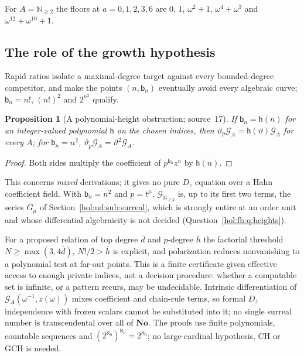 \documentclass[11pt]{article}
\numberwithin{equation}{section}
\newtheorem{proposition}[theorem]{Proposition}
\theoremstyle{definition}
\theoremstyle{remark}
\newcommand{\N}{\mathbb N}
\newcommand{\No}{\mathbf{No}}
\begin{document}
For $A=\N_{\ge2}$ the floors at $a=0,1,2,3,6$ are $0$, $1$, $\omega^2+1$,
$\omega^4+\omega^3$ and $\omega^{12}+\omega^{10}+1$.

\subsection{The role of the growth hypothesis}\label{hol:fh:sub:limits}

Rapid ratios isolate a maximal-degree target against every bounded-degree
competitor, and make the points $(n,\mathsf b_n)$ eventually avoid every
algebraic curve; $\mathsf b_n=n!$, $(n!)^2$ and $2^{n^2}$ qualify.

\begin{proposition}[A polynomial-height obstruction; source~17]
\label{hol:fh:prop:heat}
If $\mathsf b_n=\mathsf h(n)$ for an integer-valued polynomial $\mathsf h$ on
the chosen indices, then $\vartheta_p\mathcal G_A=\mathsf h(\vartheta)\mathcal
G_A$ for every $A$; for $\mathsf b_n=n^2$, $\vartheta_p\mathcal G_A=
\vartheta^2\mathcal G_A$.
\end{proposition}

\begin{proof}
Both sides multiply the coefficient of $p^{\mathsf b_n}z^n$ by $\mathsf h(n)$.
\end{proof}

This concerns \emph{mixed} derivations; it gives no pure $D_z$ equation over a
Hahn coefficient field. With $\mathsf b_n=n^2$ and $p=t^\mu$, $\mathcal
G_{\N_{\ge2}}$ is, up to its first two terms, the series $G_\mu$ of
Section~\ref{hol:ud:sub:surreal}, which is strongly entire at an order unit
and whose differential algebraicity is not decided
(Question~\ref{hol:fh:q:heights}).

For a proposed relation of top degree $\bar d$ and $p$-degree $\bar h$ the
factorial threshold $N\ge\max(3,4\bar d)$, $N!/2>\bar h$ is explicit, and
polarization reduces nonvanishing to a polynomial test at far-out points. This
is a finite certificate given effective access to enough private indices, not
a decision procedure: whether a computable set is infinite, or a pattern
recurs, may be undecidable. Intrinsic differentiation of
$\mathcal G_A(\omega^{-1},z(\omega))$ mixes coefficient and chain-rule terms, so
formal $D_z$ independence with frozen scalars cannot be substituted into it; no
single surreal number is transcendental over all of $\No$. The proofs use
finite polynomials, countable sequences and $(2^{\aleph_0})^{\aleph_0}=
2^{\aleph_0}$; no large-cardinal hypothesis, CH or GCH is needed.
\end{document}
